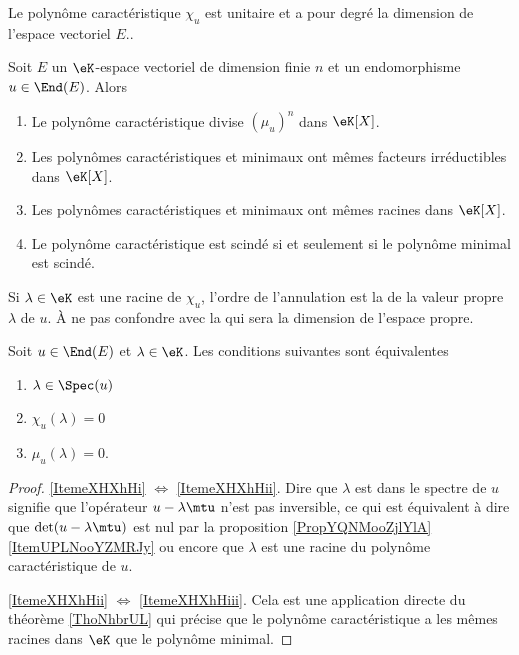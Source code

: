 \begin{lemma}       \label{LemooWCZMooZqyaHd}
    Le polynôme caractéristique \( \chi_u\) est unitaire et a pour degré la dimension de l'espace vectoriel \( E\)..
\end{lemma}

\begin{theorem}     \label{ThoNhbrUL}
    Soit \( E\) un \(\eK\)-espace vectoriel de dimension finie \( n\) et un endomorphisme \( u\in\End(E)\). Alors
    \begin{enumerate}
        \item
            Le polynôme caractéristique divise \( (\mu_u)^n\) dans \(\eK[X]\).
        \item
            Les polynômes caractéristiques et minimaux ont mêmes facteurs irréductibles dans \(\eK[X]\).
        \item
            Les polynômes caractéristiques et minimaux ont mêmes racines dans \(\eK[X]\).
        \item
            Le polynôme caractéristique est scindé si et seulement si le polynôme minimal est scindé.
    \end{enumerate}
\end{theorem}

Si \( \lambda\in\eK\) est une racine de \( \chi_u\), l'ordre de l'annulation est la  de la valeur propre \( \lambda\) de \( u\). À ne pas confondre avec la  qui sera la dimension de l'espace propre.

\begin{theorem} \label{ThoWDGooQUGSTL}
    Soit \( u\in\End(E)\) et \( \lambda\in\eK\). Les conditions suivantes sont équivalentes
    \begin{enumerate}
        \item\label{ItemeXHXhHi}
            \( \lambda\in\Spec(u)\)
        \item\label{ItemeXHXhHii}
            \( \chi_u(\lambda)=0\)
        \item\label{ItemeXHXhHiii}
            \( \mu_u(\lambda)=0\).
    \end{enumerate}
\end{theorem}

\begin{proof}
    \ref{ItemeXHXhHi} \( \Leftrightarrow\) \ref{ItemeXHXhHii}. Dire que \( \lambda\) est dans le spectre de \( u\) signifie que l'opérateur \( u-\lambda\mtu\) n'est pas inversible, ce qui est équivalent à dire que \( \det(u-\lambda\mtu)\) est nul par la proposition \ref{PropYQNMooZjlYlA}\ref{ItemUPLNooYZMRJy} ou encore que \( \lambda\) est une racine du polynôme caractéristique de \( u\). 

    \ref{ItemeXHXhHii} \( \Leftrightarrow\) \ref{ItemeXHXhHiii}. Cela est une application directe du théorème \ref{ThoNhbrUL} qui précise que le polynôme caractéristique a les mêmes racines dans \(\eK\) que le polynôme minimal.
\end{proof}


